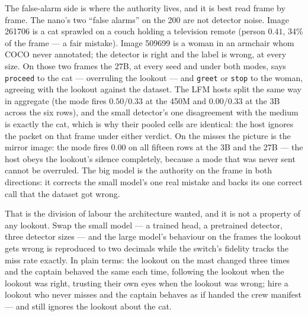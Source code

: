 \documentclass[11pt]{article}
\begin{document}
The false-alarm side is where the authority lives, and it is best read
frame by frame. The nano's two ``false alarms'' on the 200 are not
detector noise. Image 261706 is a cat sprawled on a couch holding a
television remote (person $0.41$, 34\% of the frame --- a fair mistake).
Image 509699 is a woman in an armchair whom COCO never annotated; the
detector is right and the label is wrong, at every size. On those two
frames the 27B, at every seed and under both modes, says
\texttt{proceed} to the cat --- overruling the lookout --- and
\texttt{greet} or \texttt{stop} to the woman, agreeing with the lookout
against the dataset. The LFM hosts split the same way in aggregate (the
mode fires $0.50 / 0.33$ at the 450M and $0.00 / 0.33$ at the 3B across
the six rows), and the small detector's one disagreement with the medium
is exactly the cat, which is why their pooled cells are identical: the
host ignores the packet on that frame under either verdict. On the
misses the picture is the mirror image: the mode fires $0.00$ on all
fifteen rows at the 3B and the 27B --- the host obeys the lookout's
silence completely, because a mode that was never sent cannot be
overruled. The big model is the authority on the frame in both
directions: it corrects the small model's one real mistake and backs
its one correct call that the dataset got wrong.

That is the division of labour the architecture wanted, and it is not a
property of any lookout. Swap the small model --- a trained head, a
pretrained detector, three detector sizes --- and the large model's
behaviour on the frames the lookout gets wrong is reproduced to two
decimals while the switch's fidelity tracks the miss rate exactly. In
plain terms: the lookout on the mast changed three times and the captain
behaved the same each time, following the lookout when the lookout was
right, trusting their own eyes when the lookout was wrong; hire a lookout
who never misses and the captain behaves as if handed the crew manifest
--- and still ignores the lookout about the cat.

\par\medskip
\end{document}
